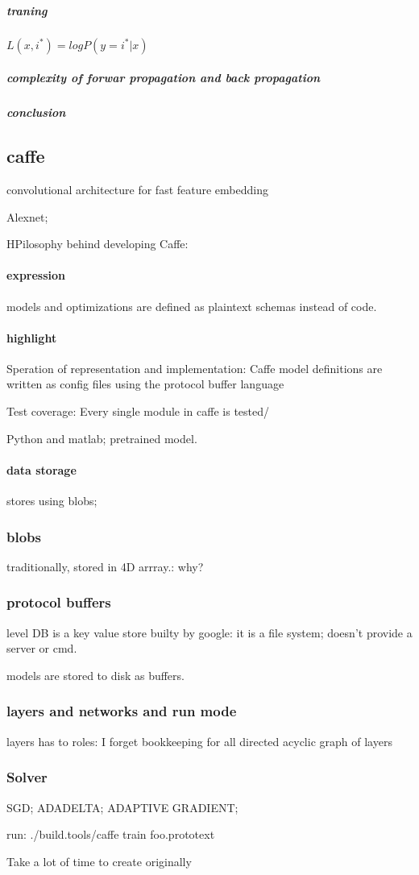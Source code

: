 \documentclass[12pt]{article}
\begin{document}
\subparagraph{traning}
$L(x, i^*) = logP(y=i^*|x)$

\subparagraph{complexity of forwar propagation and back propagation}

\subparagraph{conclusion}

\subsection{caffe}
convolutional architecture for fast feature embedding

Alexnet;

HPilosophy behind developing Caffe:

\paragraph{expression}
models and optimizations are defined as plaintext schemas instead of code.

\paragraph{highlight}
Speration of representation and implementation:
Caffe model definitions are written as config files using the protocol buffer language

Test coverage: Every single module in  caffe is tested/

Python and matlab; pretrained model.

\paragraph{data storage}
stores using blobs;
\subsubsection{blobs}
traditionally, stored in 4D arrray.: why?

\subsubsection{protocol buffers}
level DB is a key value store builty by google: it is a file system;
doesn't provide a server or cmd.

models are stored to disk as buffers.

\subsubsection{layers and networks and run mode}
layers has to roles: I forget
bookkeeping for all directed acyclic graph of layers

\subsubsection{Solver}
SGD; ADADELTA; ADAPTIVE GRADIENT;

run: ./build.tools/caffe train foo.prototext

Take a lot of time to create originally
\end{document}
